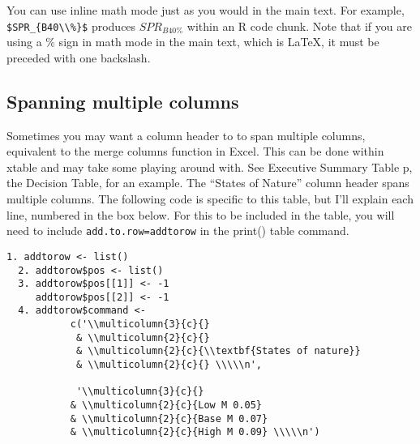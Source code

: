\documentclass[12pt,]{article}
\begin{document}
You can use inline math mode just as you would in the main text. For
example, \texttt{\$SPR\_\{B40\textbackslash{}\textbackslash{}\%\}\$}
produces \(SPR_{B40\%}\) within an R code chunk. Note that if you are
using a \% sign in math mode in the main text, which is \LaTeX, it must
be preceded with one backslash.

\subsection{Spanning multiple columns}\label{spanning-multiple-columns}

Sometimes you may want a column header to to span multiple columns,
equivalent to the merge columns function in Excel. This can be done
within xtable and may take some playing around with. See Executive
Summary Table p, the Decision Table, for an example. The ``States of
Nature'' column header spans multiple columns. The following code is
specific to this table, but I'll explain each line, numbered in the box
below. For this to be included in the table, you will need to include
\verb|add.to.row=addtorow| in the print() table command.

\begin{Verbatim}[frame=single]
  1. addtorow <- list()
  2. addtorow$pos <- list()
  3. addtorow$pos[[1]] <- -1
     addtorow$pos[[2]] <- -1
  4. addtorow$command <- 
           c('\\multicolumn{3}{c}{} 
            & \\multicolumn{2}{c}{} 
            & \\multicolumn{2}{c}{\\textbf{States of nature}} 
            & \\multicolumn{2}{c}{} \\\\\n', 
           
            '\\multicolumn{3}{c}{} 
           & \\multicolumn{2}{c}{Low M 0.05} 
           & \\multicolumn{2}{c}{Base M 0.07} 
           & \\multicolumn{2}{c}{High M 0.09} \\\\\n')
        
\end{Verbatim}
\end{document}
